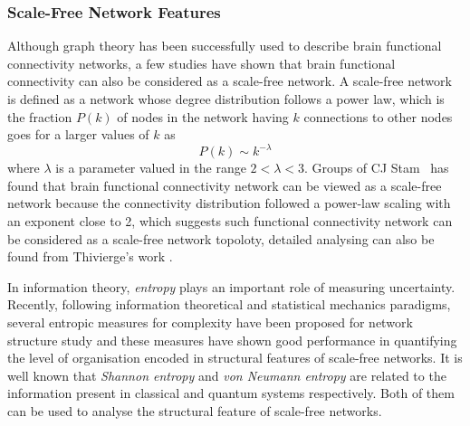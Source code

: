 \subsubsection{Scale-Free Network Features}
Although graph theory has been successfully used to describe brain functional connectivity networks, a few studies have shown that brain functional connectivity can also be considered as a scale-free network. A scale-free network is defined as a network whose degree distribution follows a power law, which is the fraction $P(k)$ of nodes in the network having $k$ connections to other nodes goes for a larger values of $k$ as
\begin{equation}
P(k) \sim k^{-\lambda}
\end{equation}
where $\lambda$ is a parameter valued in the range $2<\lambda<3$.
Groups of CJ Stam~\cite{stam2004functional} has found that brain functional connectivity network can be viewed as a scale-free network because the connectivity distribution followed a power-law scaling with an exponent close to 2, which suggests such functional connectivity network can be considered as a scale-free network topoloty\cite{van2008small}, detailed analysing can also be found from Thivierge's work \cite{thivierge2014scale}.

In information theory, \emph{entropy} plays an important role of measuring uncertainty. Recently, following information theoretical and statistical mechanics paradigms, several entropic measures for complexity have been proposed for network structure study and these measures have shown good performance in quantifying the level of organisation encoded in structural features of scale-free networks. It is well known that \emph{Shannon entropy} and \emph{von Neumann entropy} are related to the information present in classical and quantum systems respectively. Both of them can be used to analyse the structural feature of scale-free networks\cite{anand2009entropy}. 

